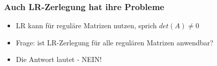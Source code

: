 \documentclass[10pt]{beamer} %
\begin{document}
\begin{frame}[fragile]
  \frametitle{Auch LR-Zerlegung hat ihre Probleme}
	\begin{itemize}[<+->]
		\item LR kann für reguläre Matrizen nutzen, sprich $det(A) \neq 0$
		\vspace*{1em}
		\item Frage: ist LR-Zerlegung für alle regulären Matrizen anwendbar?
		\vspace*{1em}
		\item Die Antwort lautet - NEIN!
	\end{itemize}
	\vspace*{2em}
  {\footnotesize
  \begin{semiverbatim}
  \end{semiverbatim}}
\end{frame}
\end{document}
